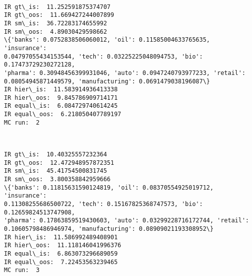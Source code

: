 \documentclass[11pt]{article}
\begin{document}
    \begin{center}
    \end{center}
    { \hspace*{\fill} \\}
    
    \begin{Verbatim}[commandchars=\\\{\},fontsize=\footnotesize]
IR gt\_is:  11.252591875374707
IR gt\_oos:  11.669427244007899
IR sm\_is:  36.72283174655992
IR sm\_oos:  4.89030429598662
\{'banks': 0.0752838506060012, 'oil': 0.11585004633765635, 'insurance':
0.04797055434153544, 'tech': 0.03225225048094753, 'bio': 0.17473729230272128,
'pharma': 0.30948456399931046, 'auto': 0.0947240793977233, 'retail':
0.08054945871449579, 'manufacturing': 0.0691479038196087\}
IR hier\_is:  11.583914936413338
IR hier\_oos:  9.845786909714171
IR equal\_is:  6.084729740614245
IR equal\_oos:  6.218050407789197
MC run:  2

    \end{Verbatim}

    \begin{center}
    \end{center}
    { \hspace*{\fill} \\}
    
    \begin{Verbatim}[commandchars=\\\{\},fontsize=\footnotesize]
IR gt\_is:  10.40325557232364
IR gt\_oos:  12.472948957872351
IR sm\_is:  45.41754500831745
IR sm\_oos:  3.800358842959666
\{'banks': 0.11815631590124819, 'oil': 0.08370554925019712, 'insurance':
0.11308255686500722, 'tech': 0.15167825368747573, 'bio': 0.12659824513747908,
'pharma': 0.17863859519430603, 'auto': 0.03299228716172744, 'retail':
0.10605798486946974, 'manufacturing': 0.08909021193308952\}
IR hier\_is:  11.586992489408901
IR hier\_oos:  11.118146041996376
IR equal\_is:  6.863073296689059
IR equal\_oos:  7.22453563239465
MC run:  3

    \end{Verbatim}

    \begin{center}
    \end{center}
    { \hspace*{\fill} \\}
    
\end{document}
